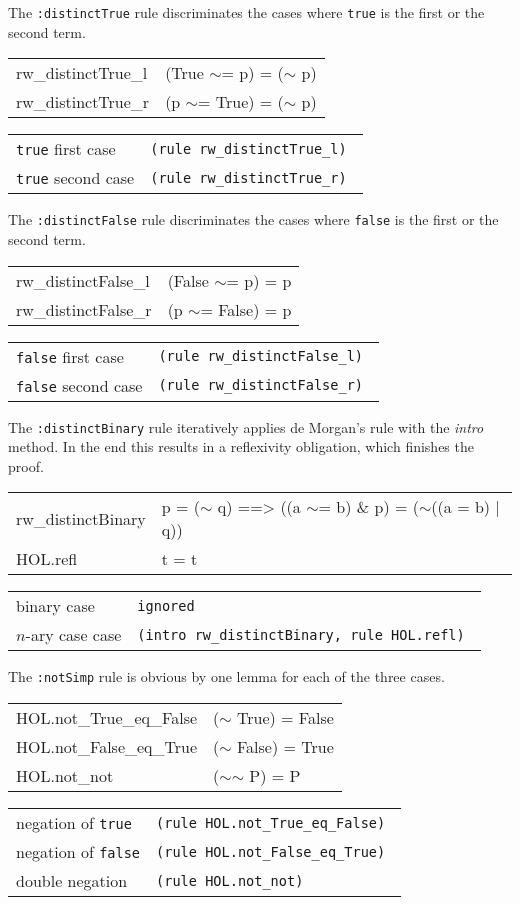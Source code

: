 \documentclass[10pt,a4paper]{article}
\newcommand{\ttt}{\texttt}
\newcommand{\negat}{\ensuremath{\sim}}
\newcommand{\nega}{\negat\xspace}
\newcommand{\true}{\ttt{true}\xspace}
\newcommand{\false}{\ttt{false}\xspace}
\newenvironment{pt}[1]{\begin{center}\begin{tt}\begin{tabular}{#1}\hline}{\end{tabular}\end{tt}\end{center}}
\newcommand{\pl}[1]{#1 \\[1mm]}
\newcommand{\pll}[1]{#1 \\\hline}
\newenvironment{rt}{\begin{center}\begin{tabular}{|l l|}\hline}{\end{tabular}\end{center}}
\newcommand{\rl}[2]{\rm{#1} & \tt{#2} \\[1mm]}
\newcommand{\rll}[2]{\rm{#1} & \tt{#2} \\\hline}
\begin{document}
The \ttt{:distinctTrue} rule discriminates the cases where \true is the first or the second term.
%
\begin{pt}{ll}
	\pl{rw\_distinctTrue\_l & (True \negat= p) = (\nega p)}
	\pll{rw\_distinctTrue\_r & (p \negat= True) = (\nega p)}
\end{pt}
%
\begin{rt}
	\rl{\true first case}{(rule rw\_distinctTrue\_l)}
	\rll{\true second case}{(rule rw\_distinctTrue\_r)}
\end{rt}

The \ttt{:distinctFalse} rule discriminates the cases where \false is the first or the second term.
%
\begin{pt}{ll}
	\pl{rw\_distinctFalse\_l & (False \negat= p) = p}
	\pll{rw\_distinctFalse\_r & (p \negat= False) = p}
\end{pt}
%
\begin{rt}
	\rl{\false first case}{(rule rw\_distinctFalse\_l)}
	\rll{\false second case}{(rule rw\_distinctFalse\_r)}
\end{rt}

The \ttt{:distinctBinary} rule iteratively applies de Morgan's rule with the \emph{intro} method. In the end this results in a reflexivity obligation, which finishes the proof.
%
\begin{pt}{ll}
	\pl{rw\_distinctBinary & p = (\nega q) ==> ((a \negat= b) \& p) = (\nega ((a = b) | q))}
	\pll{HOL.refl & t = t}
\end{pt}
%
\begin{rt}
	\rl{binary case}{\textrm{ignored}}
	\rll{$n$-ary case case}{(intro rw\_distinctBinary, rule HOL.refl)}
\end{rt}


The \ttt{:notSimp} rule is obvious by one lemma for each of the three cases.
%
\begin{pt}{ll}
	\pl{HOL.not\_True\_eq\_False & (\nega True) = False}
	\pl{HOL.not\_False\_eq\_True & (\nega False) = True}
	\pll{HOL.not\_not & (\nega \nega P) = P}
\end{pt}
%
\begin{rt}
	\rl{negation of \true}{(rule HOL.not\_True\_eq\_False)}
	\rl{negation of \false}{(rule HOL.not\_False\_eq\_True)}
	\rll{double negation}{(rule HOL.not\_not)}
\end{rt}
\end{document}

